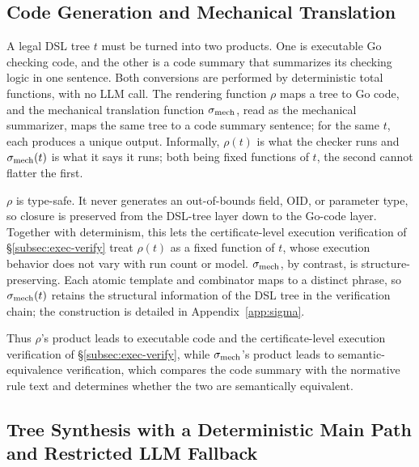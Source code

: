 \subsection{Code Generation and Mechanical Translation}
\label{subsec:mech}

A legal DSL tree $t$ must be turned into two products. One is executable Go
checking code, and the other is a code summary that
summarizes its checking logic in one sentence. Both conversions are performed by
deterministic total functions, with no LLM call. The rendering function $\rho$
maps a tree to Go code, and the mechanical translation function $\sigma_{\mathrm{mech}}$, read as
the mechanical summarizer, maps the
same tree to a code summary sentence; for the same $t$, each produces a unique
output. Informally, $\rho(t)$ is what the checker runs and $\sigma_{\mathrm{mech}}(t)$ is what it
says it runs; both being fixed functions of $t$, the second cannot flatter the
first.

$\rho$ is type-safe. It never generates an out-of-bounds field, OID, or
parameter type, so closure is preserved from the DSL-tree layer down to the
Go-code layer. Together with determinism, this lets the certificate-level
execution verification of \S\ref{subsec:exec-verify} treat $\rho(t)$ as a fixed
function of $t$, whose execution behavior does not vary with run count or model.
$\sigma_{\mathrm{mech}}$, by contrast, is structure-preserving. Each atomic template and
combinator maps to a distinct phrase, so $\sigma_{\mathrm{mech}}(t)$ retains the structural
information of the DSL tree in the verification chain; the construction is
detailed in Appendix~\ref{app:sigma}.

Thus $\rho$'s product leads to executable code and the certificate-level execution
verification of \S\ref{subsec:exec-verify}, while $\sigma_{\mathrm{mech}}$'s product leads to
semantic-equivalence verification, which compares the code summary with the
normative rule text and determines whether the two are semantically equivalent.

\subsection{Tree Synthesis with a Deterministic Main Path and Restricted LLM
Fallback}
\label{subsec:synth}

